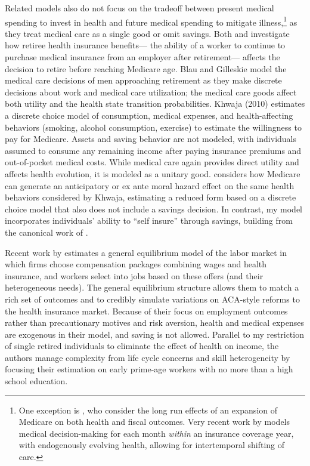 \documentclass[12pt,pdftex,letterpaper]{article}
\begin{document}
Related models also do not focus on the tradeoff between present medical spending to invest in health and future medical spending to mitigate illness,\footnote{One exception is \cite{yang08}, who consider the long run effects of an expansion of Medicare on both health and fiscal outcomes.  Very recent work by \cite{cronin16} models medical decision-making for each month \textit{within} an insurance coverage year, with endogenously evolving health, allowing for intertemporal shifting of care.} as they treat medical care as a single good or omit savings.  Both \cite{french11} and \cite{blau08} investigate how retiree health insurance benefits--- the ability of a worker to continue to purchase medical insurance from an employer after retirement--- affects the decision to retire before reaching Medicare age.  Blau and Gilleskie model the medical care decisions of men approaching retirement as they make discrete decisions about work and medical care utilization; the medical care goods affect both utility and the health state transition probabilities.  Khwaja (2010) estimates a discrete choice model of consumption, medical expenses, and health-affecting behaviors (smoking, alcohol consumption, exercise) to estimate the willingness to pay for Medicare.  Assets and saving behavior are not modeled, with individuals assumed to consume any remaining income after paying insurance premiums and out-of-pocket medical costs.  While medical care again provides direct utility and affects health evolution, it is modeled as a unitary good.  \cite{depreux11} considers how Medicare can generate an anticipatory or ex ante moral hazard effect on the same health behaviors considered by Khwaja, estimating a reduced form based on a discrete choice model that also does not include a savings decision.  In contrast, my model incorporates individuals' ability to ``self insure'' through savings, building from the canonical work of \cite{carroll97b}.

Recent work by \cite{aizawa15} estimates a general equilibrium model of the labor market in which firms choose compensation packages combining wages and health insurance, and workers select into jobs based on these offers (and their heterogeneous needs).  The general equilibrium structure allows them to match a rich set of outcomes and to credibly simulate variations on ACA-style reforms to the health insurance market.  Because of their focus on employment outcomes rather than precautionary motives and risk aversion, health and medical expenses are exogenous in their model, and saving is not allowed.  Parallel to my restriction of single retired individuals to eliminate the effect of health on income, the authors manage complexity from life cycle concerns and skill heterogeneity by focusing their estimation on early prime-age workers with no more than a high school education.
\end{document}
